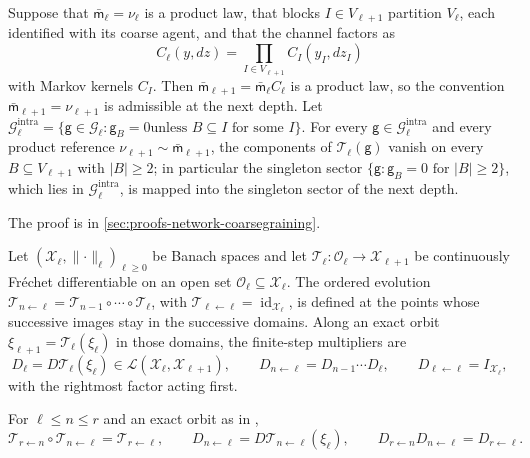 Suppose that $\bar{\mathsf m}_\ell=\nu_\ell$ is a product law, that blocks
$I\in V_{\ell+1}$ partition $V_\ell$, each identified with its coarse agent, and
that the channel factors as
\begin{equation}
C_\ell(y,dz)=\prod_{I\in V_{\ell+1}}C_I(y_I,dz_I)
\label{eq:rg-block-product-channel}
\end{equation}
with Markov kernels $C_I$. Then $\bar{\mathsf m}_{\ell+1}=\bar{\mathsf m}_\ell
C_\ell$ is a product law, so the convention $\bar{\mathsf
m}_{\ell+1}=\nu_{\ell+1}$ is admissible at the next depth. Let
$\mathcal G_\ell^{\mathrm{intra}}=\{\mathsf g\in\mathcal G_\ell:\mathsf g_B=0\text{
unless }B\subseteq I\text{ for some }I\}$. For every $\mathsf g\in\mathcal
G_\ell^{\mathrm{intra}}$ and every product reference $\nu_{\ell+1}\sim\bar{\mathsf
m}_{\ell+1}$, the components of $\mathcal T_\ell(\mathsf g)$ vanish on every
$B\subseteq V_{\ell+1}$ with $\lvert B\rvert\ge2$; in particular the singleton
sector $\{\mathsf g:\mathsf g_B=0\text{ for }\lvert B\rvert\ge2\}$, which lies in
$\mathcal G_\ell^{\mathrm{intra}}$, is mapped into the singleton sector of the next
depth. 

The proof is in \cref{sec:proofs-network-coarsegraining}.

Let $(\mathscr X_\ell,\lVert\cdot\rVert_\ell)_{\ell\ge0}$ be Banach spaces and let
$\mathcal T_\ell:\mathscr O_\ell\to\mathscr X_{\ell+1}$ be continuously Fr\'echet
differentiable on an open set $\mathscr O_\ell\subseteq\mathscr X_\ell$. The ordered
evolution $\mathcal T_{n\leftarrow\ell}=\mathcal T_{n-1}\circ\cdots\circ\mathcal
T_\ell$, with $\mathcal T_{\ell\leftarrow\ell}=\operatorname{id}_{\mathscr X_\ell}$,
is defined at the points whose successive images stay in the successive domains.
Along an exact orbit $\xi_{\ell+1}=\mathcal T_\ell(\xi_\ell)$ in those domains, the
finite-step multipliers are
\begin{equation}
D_\ell=D\mathcal T_\ell(\xi_\ell)\in\mathcal L(\mathscr X_\ell,\mathscr X_{\ell+1}),
\qquad
D_{n\leftarrow\ell}=D_{n-1}\cdots D_\ell,
\qquad
D_{\ell\leftarrow\ell}=I_{\mathscr X_\ell},
\label{eq:rg-derivative-cocycle}
\end{equation}
with the rightmost factor acting first.

For $\ell\le n\le r$ and an exact orbit as in ,
\begin{equation}
\mathcal T_{r\leftarrow n}\circ\mathcal T_{n\leftarrow\ell}=\mathcal T_{r\leftarrow\ell},
\qquad
D_{n\leftarrow\ell}=D\mathcal T_{n\leftarrow\ell}(\xi_\ell),
\qquad
D_{r\leftarrow n}D_{n\leftarrow\ell}=D_{r\leftarrow\ell}.
\label{eq:rg-cocycle-composition}
\end{equation}

